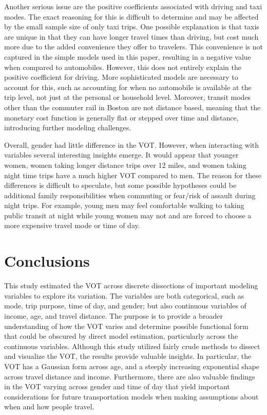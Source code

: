 \documentclass[numbered]{trbunofficial}\usepackage[]{graphicx}\usepackage[]{color}
\begin{document}
Another serious issue are the positive coefficients associated with driving and taxi modes. The exact reasoning for this is difficult to determine and may be affected by the small sample size of only  taxi trips. One possible explanation is that taxis are unique in that they can have longer travel times than driving, but cost much more due to the added convenience they offer to travelers. This convenience is not captured in the simple models used in this paper, resulting in a negative value when compared to automobiles. However, this does not entirely explain the positive coefficient for driving. More sophisticated models are necessary to account for this, such as accounting for when no automobile is available at the trip level, not just at the personal or household level. Moreover, transit modes other than the commuter rail in Boston are not distance based, meaning that the monetary cost function is generally flat or stepped over time and distance, introducing further modeling challenges.

Overall, gender had little difference in the VOT. However, when interacting with variables several interesting insights emerge. It would appear that younger women, women taking longer distance trips over 12 miles, and women taking night time trips have a much higher VOT compared to men. The reason for these differences is difficult to speculate, but some possible hypotheses could be additional family responsibilities when commuting or fear/risk of assault during night trips. For example, young men may feel comfortable walking to taking public transit at night while young women may not and are forced to choose a more expensive travel mode or time of day.

\section{Conclusions}\label{sec:conclusion}

This study estimated the VOT across discrete dissections of important modeling variables to explore its variation. The variables are both categorical, such as mode, trip purpose, time of day, and gender; but also continuous variables of income, age, and travel distance. The purpose is to provide a broader understanding of how the VOT varies and determine possible functional form that could be obscured by direct model estimation, particularly across the continuous variables. Although this study utilized fairly crude methods to dissect and visualize the VOT, the results provide valuable insights. In particular, the VOT has a Gaussian form across age, and a steeply increasing exponential shape across travel distance and income. Furthermore, there are also valuable findings in the VOT varying across gender and time of day that yield important considerations for future transportation models when making assumptions about when and how people travel.
\end{document}
